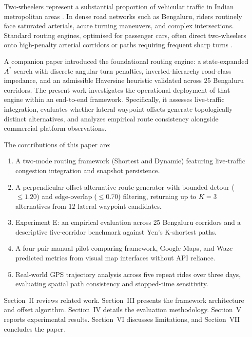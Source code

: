 \documentclass[11pt,conference]{IEEEtran}
\begin{document}
Two-wheelers represent a substantial proportion of vehicular traffic in Indian metropolitan areas \cite{kotagi2020modeling,das2019modeling}.
In dense road networks such as Bengaluru, riders routinely face saturated arterials, acute turning maneuvers, and complex intersections.
Standard routing engines, optimised for passenger cars, often direct two-wheelers onto high-penalty arterial corridors or paths requiring frequent sharp turns \cite{kumar2025realtime,luxen2011realtime}.

A companion paper \cite{anirudhr2026turnaware} introduced the foundational routing engine: a state-expanded $A^*$ search with discrete angular turn penalties, inverted-hierarchy road-class impedance, and an admissible Haversine heuristic validated across 25 Bengaluru corridors.
The present work investigates the operational deployment of that engine within an end-to-end framework.
Specifically, it assesses live-traffic integration, evaluates whether lateral waypoint offsets generate topologically distinct alternatives, and analyzes empirical route consistency alongside commercial platform observations.

The contributions of this paper are:
\begin{enumerate}
\item A two-mode routing framework (Shortest and Dynamic) featuring live-traffic congestion integration and snapshot persistence.
\item A perpendicular-offset alternative-route generator with bounded detour ($\le 1.20$) and edge-overlap ($\le 0.70$) filtering, returning up to $K=3$ alternatives from 12 lateral waypoint candidates.
\item Experiment E: an empirical evaluation across 25 Bengaluru corridors and a descriptive five-corridor benchmark against Yen's K-shortest paths.
\item A four-pair manual pilot comparing framework, Google Maps, and Waze predicted metrics from visual map interfaces without API reliance.
\item Real-world GPS trajectory analysis across five repeat rides over three days, evaluating spatial path consistency and stopped-time sensitivity.
\end{enumerate}

Section~II reviews related work. Section~III presents the framework architecture and offset algorithm. Section~IV details the evaluation methodology. Section~V reports experimental results. Section~VI discusses limitations, and Section~VII concludes the paper.
\end{document}
